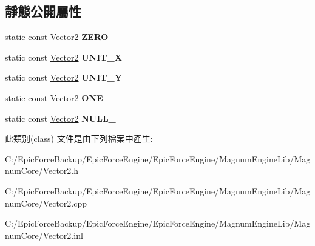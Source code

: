 \subsection*{靜態公開屬性}
\begin{DoxyCompactItemize}
\item 
static const \hyperlink{class_magnum_1_1_vector2}{Vector2} {\bfseries Z\+E\+RO}\hypertarget{class_magnum_1_1_vector2_aa229b967fdb213d19a76e8ea588e53a0}{}\label{class_magnum_1_1_vector2_aa229b967fdb213d19a76e8ea588e53a0}

\item 
static const \hyperlink{class_magnum_1_1_vector2}{Vector2} {\bfseries U\+N\+I\+T\+\_\+X}\hypertarget{class_magnum_1_1_vector2_a8f4a2342388bfc0dff6cb2627d45850f}{}\label{class_magnum_1_1_vector2_a8f4a2342388bfc0dff6cb2627d45850f}

\item 
static const \hyperlink{class_magnum_1_1_vector2}{Vector2} {\bfseries U\+N\+I\+T\+\_\+Y}\hypertarget{class_magnum_1_1_vector2_accae044323c93c9ceaaefe4a69cca49d}{}\label{class_magnum_1_1_vector2_accae044323c93c9ceaaefe4a69cca49d}

\item 
static const \hyperlink{class_magnum_1_1_vector2}{Vector2} {\bfseries O\+NE}\hypertarget{class_magnum_1_1_vector2_a68c2674df24c6502a66e3db99efe34b7}{}\label{class_magnum_1_1_vector2_a68c2674df24c6502a66e3db99efe34b7}

\item 
static const \hyperlink{class_magnum_1_1_vector2}{Vector2} {\bfseries N\+U\+L\+L\+\_\+}\hypertarget{class_magnum_1_1_vector2_afe1ee5309f7e875384be2b6159fbb354}{}\label{class_magnum_1_1_vector2_afe1ee5309f7e875384be2b6159fbb354}

\end{DoxyCompactItemize}


此類別(class) 文件是由下列檔案中產生\+:\begin{DoxyCompactItemize}
\item 
C\+:/\+Epic\+Force\+Backup/\+Epic\+Force\+Engine/\+Epic\+Force\+Engine/\+Magnum\+Engine\+Lib/\+Magnum\+Core/Vector2.\+h\item 
C\+:/\+Epic\+Force\+Backup/\+Epic\+Force\+Engine/\+Epic\+Force\+Engine/\+Magnum\+Engine\+Lib/\+Magnum\+Core/Vector2.\+cpp\item 
C\+:/\+Epic\+Force\+Backup/\+Epic\+Force\+Engine/\+Epic\+Force\+Engine/\+Magnum\+Engine\+Lib/\+Magnum\+Core/Vector2.\+inl\end{DoxyCompactItemize}
